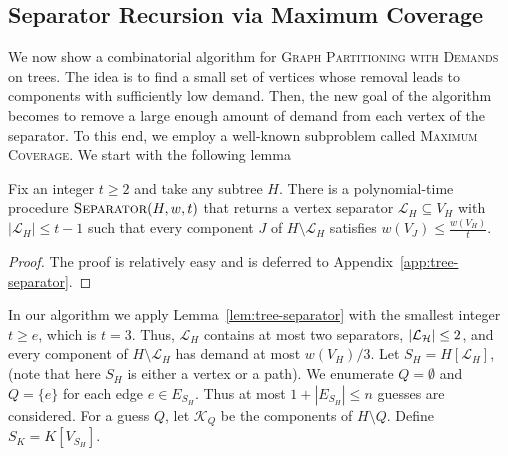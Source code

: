 \fi

\subsection{Separator Recursion via Maximum Coverage}
\label{sec:Separator-Recursion-via-Maximum-Coverage}

We now show a combinatorial algorithm for \textsc{Graph Partitioning with Demands} on trees. The idea is to find a small set of vertices whose removal leads to components with sufficiently low demand. Then, the new goal of the algorithm becomes to remove a large enough amount of demand from each vertex of the separator. To this end, we employ a well-known subproblem called \textsc{Maximum Coverage}.  We start with the following lemma

\begin{lemma}\label{lem:tree-separator}
    Fix an integer $t\geq2$ and take any subtree $H$. There is a polynomial-time procedure $\textsc{Separator}(H, w, t)$ that returns a vertex separator $\mathcal L_H\subseteq V_H$ with $|\mathcal L_H|\leq t-1$ such that every component $J$ of $H\setminus\mathcal L_H$ satisfies $
        w(V_J)\leq\frac{w(V_H)}{t}.$
\end{lemma}
\begin{proof}
The proof is relatively easy and is deferred to Appendix~\ref{app:tree-separator}.
\end{proof}



In our algorithm we apply Lemma~\ref{lem:tree-separator} with the smallest integer $t\geq e$, which is $t=3$. 
Thus, $\mathcal L_H$ contains at most two separators, $\mathopen{}\left| \mathcal{L_H} \right|\leq 2$, and every component of $H\setminus\mathcal L_H$ has demand at most $w(V_H)/3$.
Let $S_H=H[\mathcal L_H]$, (note that here $S_H$ is either a vertex or a path). 
We enumerate $Q=\emptyset$ and $Q=\{e\}$ for each edge $e\in E_{S_H}$. Thus at most $1+|E_{S_H}|\leq n$ guesses are considered. For a guess $Q$, let $\mathcal K_Q$ be the components of $H\setminus Q$.
Define $S_K=K[V_{S_H}]$.

